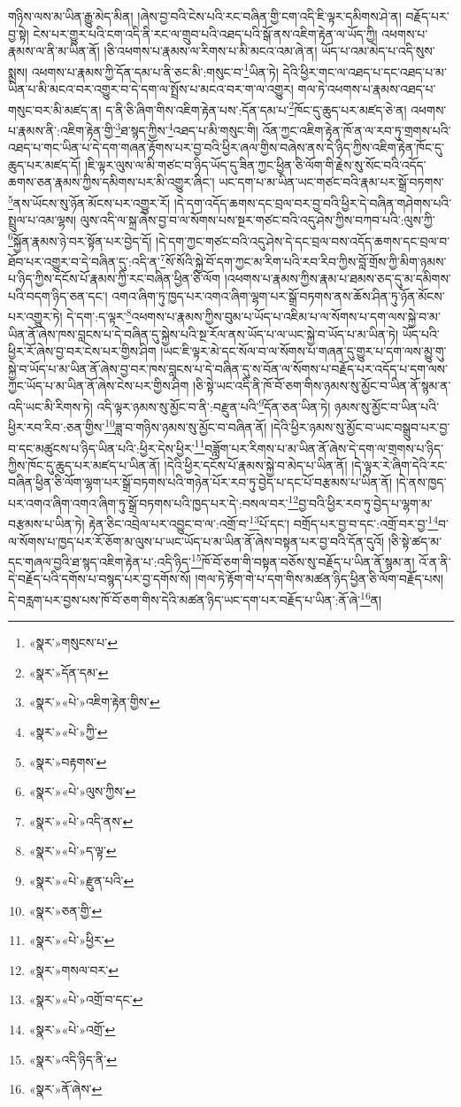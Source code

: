 གཉིས་ལས་མ་ཡིན་རྒྱུ་མེད་མིན། །ཞེས་བྱ་བའི་ངེས་པའི་རང་བཞིན་གྱི་ངག་འདི་ཇི་ལྟར་དམིགས་ཤེ་ན། བརྗོད་པར་བྱ་སྟེ། ངེས་པར་གྱུར་པའི་ངག་འདི་ནི་རང་ལ་གྲུབ་པའི་འཐད་པའི་སྒོ་ནས་འཇིག་རྟེན་ལ་ཡོད་ཀྱི། འཕགས་པ་རྣམས་ལ་ནི་མ་ཡིན་ནོ། །ཅི་འཕགས་པ་རྣམས་ལ་རིགས་པ་མི་མངའ་འམ་ཞེ་ན། ཡོད་པ་འམ་མེད་པ་འདི་སུས་སྨྲས། འཕགས་པ་རྣམས་ཀྱི་དོན་དམ་པ་ནི་ཅང་མི་:གསུང་བ་\footnote{«སྣར་»གསུངས་པ་}ཡིན་ཏེ། དེའི་ཕྱིར་གང་ལ་འཐད་པ་དང་འཐད་པ་མ་ཡིན་པ་མི་མངའ་བར་འགྱུར་བ་དེ་དག་ལ་སྤྲོས་པ་མངའ་བར་ག་ལ་འགྱུར། གལ་ཏེ་འཕགས་པ་རྣམས་འཐད་པ་གསུང་བར་མི་མཛད་ན། ད་ནི་ཅི་ཞིག་གིས་འཇིག་རྟེན་པས་:དོན་དམ་པ་\footnote{«སྣར་»དོན་དམ་}ཁོང་དུ་ཆུད་པར་མཛད་ཅེ་ན། འཕགས་པ་རྣམས་ནི་:འཇིག་རྟེན་གྱི་\footnote{«སྣར་»«པེ་»འཇིག་རྟེན་གྱིས་}ཐ་སྙད་ཀྱིས་\footnote{«སྣར་»«པེ་»ཀྱི་}འཐད་པ་མི་གསུང་གི། འོན་ཀྱང་འཇིག་རྟེན་ཁོ་ན་ལ་རབ་ཏུ་གྲགས་པའི་འཐད་པ་གང་ཡིན་པ་དེ་དག་གཞན་རྟོགས་པར་བྱ་བའི་ཕྱིར་ཞལ་གྱིས་བཞེས་ནས་དེ་ཉིད་ཀྱིས་འཇིག་རྟེན་ཁོང་དུ་ཆུད་པར་མཛད་དོ། །ཇི་ལྟར་ལུས་ལ་མི་གཙང་བ་ཉིད་ཡོད་དུ་ཟིན་ཀྱང་ཕྱིན་ཅི་ལོག་གི་རྗེས་སུ་སོང་བའི་འདོད་ཆགས་ཅན་རྣམས་ཀྱིས་དམིགས་པར་མི་འགྱུར་ཞིང་། ཡང་དག་པ་མ་ཡིན་ཡང་གཙང་བའི་རྣམ་པར་སྒྲོ་བཏགས་\footnote{«སྣར་»བརྟགས་}ནས་ཡོངས་སུ་ཉོན་མོངས་པར་འགྱུར་རོ། །དེ་དག་འདོད་ཆགས་དང་བྲལ་བར་བྱ་བའི་ཕྱིར་དེ་བཞིན་གཤེགས་པའི་སྤྲུལ་པ་འམ་ལྷས། ལུས་འདི་ལ་སྐྲ་ཞེས་བྱ་བ་ལ་སོགས་པས་སྔར་གཙང་བའི་འདུ་ཤེས་ཀྱིས་བཀབ་པའི་:ལུས་ཀྱི་\footnote{«སྣར་»«པེ་»ལུས་ཀྱིས་}སྐྱོན་རྣམས་ཉེ་བར་སྟོན་པར་བྱེད་དོ། །དེ་དག་ཀྱང་གཙང་བའི་འདུ་ཤེས་དེ་དང་བྲལ་བས་འདོད་ཆགས་དང་བྲལ་བ་ཐོབ་པར་འགྱུར་བ་དེ་བཞིན་དུ་:འདི་ན་\footnote{«སྣར་»«པེ་»འདི་ནས་}སོ་སོའི་སྐྱེ་བོ་དག་ཀྱང་མ་རིག་པའི་རབ་རིབ་ཀྱིས་བློ་གྲོས་ཀྱི་མིག་ཉམས་པ་ཉིད་ཀྱིས་དངོས་པོ་རྣམས་ཀྱི་རང་བཞིན་ཕྱིན་ཅི་ལོག །འཕགས་པ་རྣམས་ཀྱིས་རྣམ་པ་ཐམས་ཅད་དུ་མ་དམིགས་པའི་བདག་ཉིད་ཅན་དང་། འགའ་ཞིག་ཏུ་ཁྱད་པར་འགའ་ཞིག་ལྷག་པར་སྒྲོ་བཏགས་ནས་ཆོས་ཤིན་ཏུ་ཉོན་མོངས་པར་འགྱུར་ཏེ། དེ་དག་:ད་ལྟར་\footnote{«སྣར་»«པེ་»ད་ལྟ་}འཕགས་པ་རྣམས་ཀྱིས་བུམ་པ་ཡོད་པ་འཇིམ་པ་ལ་སོགས་པ་དག་ལས་སྐྱེ་བ་མ་ཡིན་ནོ་ཞེས་ཁས་བླངས་པ་དེ་བཞིན་དུ་སྐྱེས་པའི་སྔ་རོལ་ནས་ཡོད་པ་ལ་ཡང་སྐྱེ་བ་ཡོད་པ་མ་ཡིན་ཏེ། ཡོད་པའི་ཕྱིར་རོ་ཞེས་བྱ་བར་ངེས་པར་གྱིས་ཤིག །ཡང་ཇི་ལྟར་མེ་དང་སོལ་བ་ལ་སོགས་པ་གཞན་དུ་གྱུར་པ་དག་ལས་མྱུ་གུ་སྐྱེ་བ་ཡོད་པ་མ་ཡིན་ནོ་ཞེས་བྱ་བར་ཁས་བླངས་པ་དེ་བཞིན་དུ་ས་བོན་ལ་སོགས་པ་བརྗོད་པར་འདོད་པ་དག་ལས་ཀྱང་ཡོད་པ་མ་ཡིན་ནོ་ཞེས་ངེས་པར་གྱིས་ཤིག །ཅི་སྟེ་ཡང་འདི་ནི་ཁོ་བོ་ཅག་གིས་ཉམས་སུ་མྱོང་བ་ཡིན་ནོ་སྙམ་ན་འདི་ཡང་མི་རིགས་ཏེ། འདི་ལྟར་ཉམས་སུ་མྱོང་བ་ནི་:བརྫུན་པའི་\footnote{«སྣར་»«པེ་»རྫུན་པའི་}དོན་ཅན་ཡིན་ཏེ། ཉམས་སུ་མྱོང་བ་ཡིན་པའི་ཕྱིར་རབ་རིབ་:ཅན་གྱིས་\footnote{«སྣར་»ཅན་གྱི་}ཟླ་བ་གཉིས་ཉམས་སུ་མྱོང་བ་བཞིན་ནོ། །དེའི་ཕྱིར་ཉམས་སུ་མྱོང་བ་ཡང་བསྒྲུབ་པར་བྱ་བ་དང་མཚུངས་པ་ཉིད་ཡིན་པའི་:ཕྱིར་དེས་ཕྱིར་\footnote{«སྣར་»«པེ་»ཕྱིར་}བཟློག་པར་རིགས་པ་མ་ཡིན་ནོ་ཞེས་དེ་དག་ལ་གྲགས་པ་ཉིད་ཀྱིས་ཁོང་དུ་ཆུད་པར་མཛད་པ་ཡིན་ནོ། །དེའི་ཕྱིར་དངོས་པོ་རྣམས་སྐྱེ་བ་མེད་པ་ཡིན་ནོ། །དེ་ལྟར་རེ་ཞིག་དེའི་རང་བཞིན་ཕྱིན་ཅི་ལོག་ལྷག་པར་སྒྲོ་བཏགས་པའི་གཉེན་པོར་རབ་ཏུ་བྱེད་པ་དང་པོ་བརྩམས་པ་ཡིན་ནོ། །དེ་ནས་ཁྱད་པར་འགའ་ཞིག་འགའ་ཞིག་ཏུ་སྒྲོ་བཏགས་པའི་ཁྱད་པར་དེ་:བསལ་བར་\footnote{«སྣར་»གསལ་བར་}བྱ་བའི་ཕྱིར་རབ་ཏུ་བྱེད་པ་ལྷག་མ་བརྩམས་པ་ཡིན་ཏེ། རྟེན་ཅིང་འབྲེལ་པར་འབྱུང་བ་ལ་:འགྲོ་བ་\footnote{«སྣར་»«པེ་»འགྲོ་བ་དང་}པོ་དང་། བགྲོད་པར་བྱ་བ་དང་:འགྲོ་བར་བྱ་\footnote{«སྣར་»«པེ་»འགྲོ་}བ་ལ་སོགས་པ་ཁྱད་པར་རོ་ཅོག་མ་ལུས་པ་ཡང་ཡོད་པ་མ་ཡིན་ནོ་ཞེས་བསྟན་པར་བྱ་བའི་དོན་དུའོ། །ཅི་སྟེ་ཚད་མ་དང་གཞལ་བྱའི་ཐ་སྙད་འཇིག་རྟེན་པ་:འདི་ཉིད་\footnote{«སྣར་»འདི་ཉིད་ནི་}ཁོ་བོ་ཅག་གི་བསྟན་བཅོས་སུ་བརྗོད་པ་ཡིན་ནོ་སྙམ་ན། འོ་ན་ནི་དེ་བརྗོད་པའི་དགོས་པ་བསྙད་པར་བྱ་དགོས་སོ། །གལ་ཏེ་རྟོག་གེ་པ་དག་གིས་མཚན་ཉིད་ཕྱིན་ཅི་ལོག་བརྗོད་པས། དེ་བརླག་པར་བྱས་པས་ཁོ་བོ་ཅག་གིས་དེའི་མཚན་ཉིད་ཡང་དག་པར་བརྗོད་པ་ཡིན་:ནོ་ཞེ་\footnote{«སྣར་»ནོ་ཞེས་}ན། 